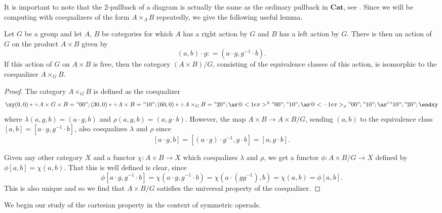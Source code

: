 \documentclass{amsbook} %
\newcommand{\mb}{\mathbf}
\numberwithin{section}{chapter}
\begin{document}
It is important to note that the  $2$-pullback of a diagram is actually the same as the ordinary pullback in $\mb{Cat}$, see \cite{kelly-elem}. Since we will be computing with coequalizers of the form $A \times_{\Lambda} B$ repeatedly, we give the following useful lemma.

\begin{lem}\label{coeq-lem}
Let $G$ be a group and let $A$, $B$ be categories for which $A$ has a right action by $G$ and $B$ has a left action by $G$. There is then an action of $G$ on the product $A \times B$ given by
    \[
        (a,b) \cdot g \colon= (a \cdot g, g^{-1} \cdot b).
    \]
If this action of $G$ on $A \times B$ is free, then the category $(A \times B)/G$, consisting of the equivalence classes of this action, is isomorphic to the coequalizer $A \times_G B$.
\end{lem}
\begin{proof}
The category $A \times_G B$ is defined as the coequalizer
    \[
        \xy
            (0,0)*+{A \times G \times B}="00";
            (30,0)*+{A \times B}="10";
            (60,0)*+{A \times_G B}="20";
            {\ar@<1ex>^{\lambda} "00" ; "10"};
            {\ar@<-1ex>_{\rho} "00" ; "10"};
            {\ar^{\varepsilon} "10" ; "20"};
        \endxy
    \]
where $\lambda(a,g,b) = (a \cdot g, b)$ and $\rho(a,g,b) = (a, g \cdot b)$. However, the map $A \times B \rightarrow A \times B/G$, sending $(a,b)$ to the equivalence class $[a,b] = [a \cdot g, g^{-1} \cdot b]$, also coequalizes $\lambda$ and $\rho$ since
    \[
        [a \cdot g, b] = [(a \cdot g) \cdot g^{-1}, g \cdot b] = [a, g \cdot b].
    \]

Given any other category $X$ and a functor $\chi \colon A \times B \rightarrow X$ which coequalizes $\lambda$ and $\rho$, we get a functor $\phi \colon A \times B/G \rightarrow X$ defined by $\phi[a,b] = \chi(a,b)$. That this is well defined is clear, since
    \[
        \phi[a \cdot g, g^{-1} \cdot b] = \chi(a \cdot g, g^{-1} \cdot b) = \chi(a \cdot (gg^{-1}), b) = \chi(a, b) = \phi[a,b].
    \]
This is also unique and so we find that $A \times B/G$ satisfies the universal property of the coequalizer.
\end{proof}

We begin our study of the cartesian property in the context of symmetric operads.
\end{document}
